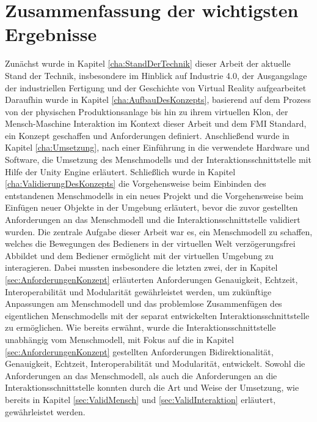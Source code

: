 \section{Zusammenfassung der wichtigsten Ergebnisse}\label{sec:ZusammenfassungErgebnisse}
Zunächst wurde in Kapitel \ref{cha:StandDerTechnik} dieser Arbeit der aktuelle Stand der Technik, insbesondere im Hinblick auf Industrie 4.0, der Ausgangslage der industriellen Fertigung und der Geschichte von Virtual Reality aufgearbeitet
Daraufhin wurde in Kapitel \ref{cha:AufbauDesKonzepts}, basierend auf dem Prozess von der physischen Produktionsanlage bis hin zu ihrem virtuellen Klon, der Mensch-Maschine Interaktion im Kontext dieser Arbeit und dem FMI Standard, ein Konzept geschaffen und Anforderungen definiert.
Anschließend wurde in Kapitel \ref{cha:Umsetzung}, nach einer Einführung in die verwendete Hardware und Software, die Umsetzung des Menschmodells und der Interaktionsschnittstelle mit Hilfe der Unity Engine erläutert. 
Schließlich wurde in Kapitel \ref{cha:ValidierungDesKonzepts} die Vorgehensweise beim Einbinden des entstandenen Menschmodells in ein neues Projekt und die Vorgehensweise beim Einfügen neuer Objekte in der Umgebung erläutert, bevor die zuvor gestellten Anforderungen an das Menschmodell und die Interaktionsschnittstelle validiert wurden.
\newline\newline
Die zentrale Aufgabe dieser Arbeit war es, ein Menschmodell zu schaffen, welches die Bewegungen des Bedieners in der virtuellen Welt verzögerungsfrei Abbildet und dem Bediener ermöglicht mit der virtuellen Umgebung zu interagieren. Dabei mussten insbesondere die letzten zwei, der in Kapitel \ref{sec:AnforderungenKonzept} erläuterten Anforderungen Genauigkeit, Echtzeit, Interoperabilität und Modularität gewährleistet werden, um zukünftige Anpassungen am Menschmodell und das problemlose Zusammenfügen des eigentlichen Menschmodells mit der separat entwickelten Interaktionsschnittstelle zu ermöglichen.
\newline
Wie bereits erwähnt, wurde die Interaktionsschnittstelle unabhängig vom Menschmodell, mit Fokus auf die in Kapitel \ref{sec:AnforderungenKonzept} gestellten Anforderungen Bidirektionalität, Genauigkeit, Echtzeit, Interoperabilität und Modularität, entwickelt. Sowohl die Anforderungen an das Menschmodell, als auch die Anforderungen an die Interaktionsschnittstelle konnten durch die Art und Weise der Umsetzung, wie bereits in Kapitel \ref{sec:ValidMensch} und \ref{sec:ValidInteraktion} erläutert, gewährleistet werden.

